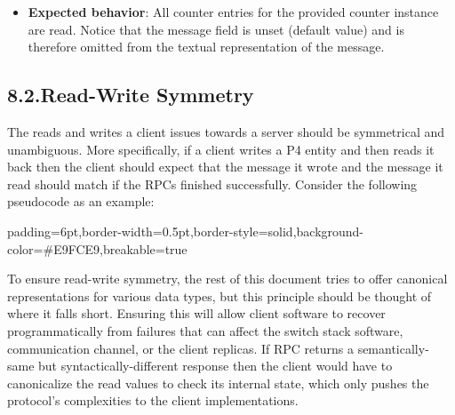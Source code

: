 \documentclass[11pt]{article}
\begin{document}
{\begin{enumerate}
\begin{itemize}[noitemsep,topsep=\mdcompacttopsep]
\item{}\textbf{Expected behavior}: All counter entries for the provided counter
instance are read. Notice that the  message field is unset (default
value) and is therefore omitted from the textual representation of the
message.%
\end{itemize}%
\end{enumerate}%

\subsection{8.2.\hspace*{0.5em}Read-Write Symmetry}\label{sec-read-write-symmetry}%

\noindent{}The reads and writes a client issues towards a server should be symmetrical and
unambiguous. More specifically, if a client writes a P4 entity and then reads it
back then the client should expect that the message it wrote and the message it
read should match if the RPCs finished successfully. Consider the following
pseudocode as an example:%

\begin{mdbmargintb}{6pt}{6pt}%
\begin{mdblock}{padding=6pt,border-width=0.5pt,border-style=solid,background-color=\#E9FCE9,breakable=true}%
\begin{mdpre}%
\end{mdpre}%
\end{mdblock}%
\end{mdbmargintb}%

\noindent{}To ensure read-write symmetry, the rest of this document tries to offer
canonical representations for various data types, but this principle should be
thought of where it falls short. Ensuring this will allow client software to
recover programmatically from failures that can affect the switch stack
software, communication channel, or the client replicas. If  RPC returns a
semantically-same but syntactically-different response then the client would
have to canonicalize the read values to check its internal state, which only
pushes the protocol's complexities to the client implementations.%

}
\end{document}
